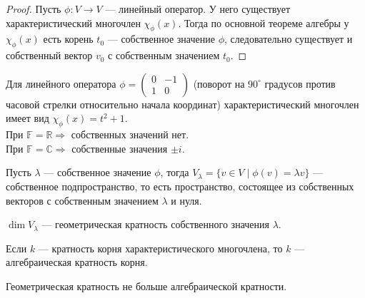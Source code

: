 \begin{proof}
	Пусть $\phi: V \to V$ --- линейный оператор. У него существует характеристический многочлен $\chi_\phi(x)$. Тогда по основной теореме алгебры у $\chi_\phi(x)$ есть корень $t_0$ --- собственное значение $\phi$, следовательно существует и собственный вектор $v_0$  с собственным значением $t_0$.
\end{proof}

\begin{Examples}
	Для линейного оператора $\phi = \begin{pmatrix}
    0& -1 \\
    1& 0
    \end{pmatrix}$
    (поворот на $90^\circ$ градусов против часовой стрелки относительно начала координат) характеристический многочлен имеет вид $\chi_\phi(x) = t^2+1$.
    \\ При $\mathbb{F}  = \mathbb{R} \Rightarrow$ собственных значений нет.
    \\ При $\mathbb{F} = \mathbb{C} \Rightarrow$ собственные значения $\pm i$.
\end{Examples}

\begin{Def}
	Пусть $\lambda$ --- собственное значение $\phi$, тогда $V_\lambda = \{v \in V \; | \; \phi(v) = \lambda v\}$ --- собственное подпространство, то есть пространство, состоящее из собственных векторов с собственным значением $\lambda$ и нуля.
\end{Def}

\begin{Def}
	$\dim V_\lambda$ --- геометрическая кратность собственного значения $\lambda$.
\end{Def}

\begin{Def}
	Если $k$ --- кратность корня характеристического многочлена, то $k$ --- алгебраическая кратность корня.
\end{Def}

\begin{Statement}
	Геометрическая кратность не больше алгебраической кратности.
\end{Statement}


